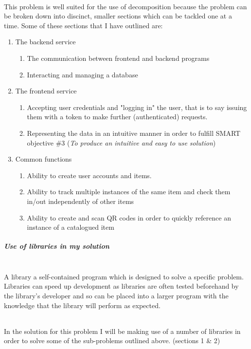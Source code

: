 \documentclass[../../../main.tex]{subfiles}
\begin{document}
\noindent \\ This problem is well suited for the use of decomposition because the problem can be
broken down into discinct, smaller sections which can be tackled one at a time. Some of these sections that I have outlined are:
\begin{enumerate}
  \item The backend service
        \begin{enumerate}
          \item The communication between frontend and backend programs
          \item Interacting and managing a database
        \end{enumerate}
  \item The frontend service
        \begin{enumerate}
          \item Accepting user credentials and "logging in" the user, that is to say
                issuing them with a token to make further (authenticated) requests.
          \item Representing the data in an intuitive manner in order to fulfill SMART objective \#3 (\textit{To produce an intuitive and easy to use solution})
        \end{enumerate}

  \item Common functions
        \begin{enumerate}
          \item Ability to create user accounts and items.
          \item Ability to track multiple instances of the same item and check them in/out independently of other items
          \item Ability to create and scan QR codes in order to quickly reference an instance of a catalogued item
        \end{enumerate}
\end{enumerate}

\subparagraph{Use of libraries in my solution}

\noindent \\ A library a self-contained program which is designed to solve a specific problem.
Libraries can speed up development as libraries are often tested beforehand by the library's
developer and so can be placed into a larger program with the knowledge that the library will
perform as expected.

\noindent \\ In the solution for this problem I will be making use of a number of libraries
in order to solve some of the sub-problems outlined above. (sections 1 \& 2)
\end{document}
